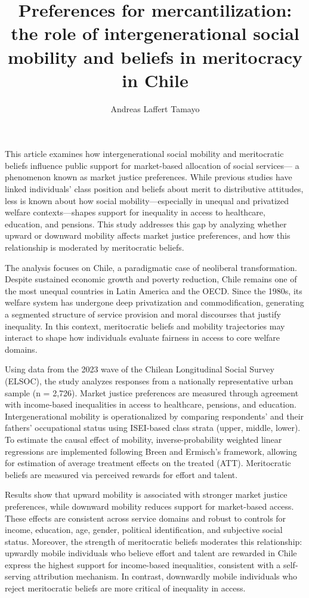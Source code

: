 \documentclass[
  12pt,
]{article}
\title{Preferences for mercantilization: the role of intergenerational
social mobility and beliefs in meritocracy in Chile}
\author{Andreas Laffert Tamayo}
\affil{%
                  Instituto de Sociología, Pontificia Universidad
                  Católica de Chile
              }
\date{}
\begin{document}
\maketitle

This article examines how intergenerational social mobility and
meritocratic beliefs influence public support for market-based
allocation of social services--- a phenomenon known as market justice
preferences. While previous studies have linked individuals' class
position and beliefs about merit to distributive attitudes, less is
known about how social mobility---especially in unequal and privatized
welfare contexts---shapes support for inequality in access to
healthcare, education, and pensions. This study addresses this gap by
analyzing whether upward or downward mobility affects market justice
preferences, and how this relationship is moderated by meritocratic
beliefs.

The analysis focuses on Chile, a paradigmatic case of neoliberal
transformation. Despite sustained economic growth and poverty reduction,
Chile remains one of the most unequal countries in Latin America and the
OECD. Since the 1980s, its welfare system has undergone deep
privatization and commodification, generating a segmented structure of
service provision and moral discourses that justify inequality. In this
context, meritocratic beliefs and mobility trajectories may interact to
shape how individuals evaluate fairness in access to core welfare
domains.

Using data from the 2023 wave of the Chilean Longitudinal Social Survey
(ELSOC), the study analyzes responses from a nationally representative
urban sample (n = 2,726). Market justice preferences are measured
through agreement with income-based inequalities in access to
healthcare, pensions, and education. Intergenerational mobility is
operationalized by comparing respondents' and their fathers'
occupational status using ISEI-based class strata (upper, middle,
lower). To estimate the causal effect of mobility, inverse-probability
weighted linear regressions are implemented following Breen and
Ermisch's framework, allowing for estimation of average treatment
effects on the treated (ATT). Meritocratic beliefs are measured via
perceived rewards for effort and talent.

Results show that upward mobility is associated with stronger market
justice preferences, while downward mobility reduces support for
market-based access. These effects are consistent across service domains
and robust to controls for income, education, age, gender, political
identification, and subjective social status. Moreover, the strength of
meritocratic beliefs moderates this relationship: upwardly mobile
individuals who believe effort and talent are rewarded in Chile express
the highest support for income-based inequalities, consistent with a
self-serving attribution mechanism. In contrast, downwardly mobile
individuals who reject meritocratic beliefs are more critical of
inequality in access.
\end{document}
